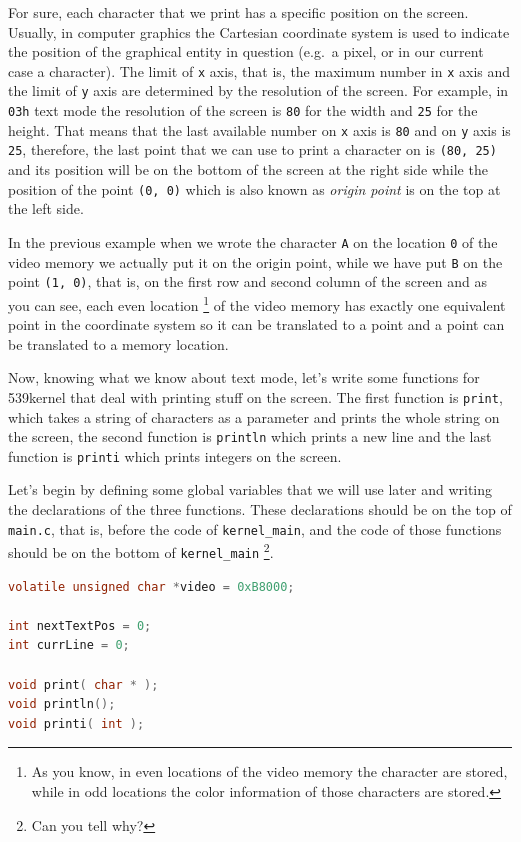 For sure, each character that we print has a specific position on the
screen. Usually, in computer graphics the Cartesian coordinate system is
used to indicate the position of the graphical entity in question
(e.g.~a pixel, or in our current case a character). The limit of
\lstinline!x! axis, that is, the maximum number in \lstinline!x! axis
and the limit of \lstinline!y! axis are determined by the resolution of
the screen. For example, in \lstinline!03h! text mode the resolution of
the screen is \lstinline!80! for the width and \lstinline!25! for the
height. That means that the last available number on \lstinline!x! axis
is \lstinline!80! and on \lstinline!y! axis is \lstinline!25!,
therefore, the last point that we can use to print a character on is
\lstinline!(80, 25)! and its position will be on the bottom of the
screen at the right side while the position of the point
\lstinline!(0, 0)! which is also known as \emph{origin point} is on the
top at the left side.

In the previous example when we wrote the character \lstinline!A! on the
location \lstinline!0! of the video memory we actually put it on the
origin point, while we have put \lstinline!B! on the point
\lstinline!(1, 0)!, that is, on the first row and second column of the
screen and as you can see, each even location \footnote{As you know, in
  even locations of the video memory the character are stored, while in
  odd locations the color information of those characters are stored.}
of the video memory has exactly one equivalent point in the coordinate
system so it can be translated to a point and a point can be translated
to a memory location.

Now, knowing what we know about text mode, let's write some functions
for 539kernel that deal with printing stuff on the screen. The first
function is \lstinline!print!, which takes a string of characters as a
parameter and prints the whole string on the screen, the second function
is \lstinline!println! which prints a new line and the last function is
\lstinline!printi! which prints integers on the screen.

Let's begin by defining some global variables that we will use later and
writing the declarations of the three functions. These declarations
should be on the top of \lstinline!main.c!, that is, before the code of
\lstinline!kernel_main!, and the code of those functions should be on
the bottom of \lstinline!kernel_main! \footnote{Can you tell why?}.

\begin{lstlisting}[language=C]
volatile unsigned char *video = 0xB8000;

int nextTextPos = 0;
int currLine = 0;

void print( char * );
void println();
void printi( int );
\end{lstlisting}

